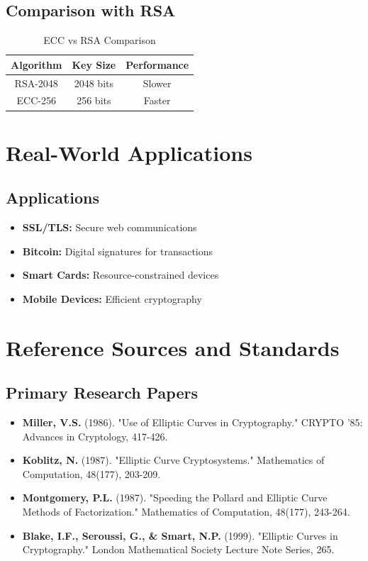 \documentclass[11pt,a4paper]{article}
\begin{document}
\subsection{Comparison with RSA}

\begin{table}[h]
\centering
\begin{tabular}{|c|c|c|}
\hline
\textbf{Algorithm} & \textbf{Key Size} & \textbf{Performance} \\
\hline
RSA-2048 & 2048 bits & Slower \\
ECC-256 & 256 bits & Faster \\
\hline
\end{tabular}
\caption{ECC vs RSA Comparison}
\end{table}

\section{Real-World Applications}

\subsection{Applications}

\begin{itemize}
    \item \textbf{SSL/TLS:} Secure web communications
    \item \textbf{Bitcoin:} Digital signatures for transactions
    \item \textbf{Smart Cards:} Resource-constrained devices
    \item \textbf{Mobile Devices:} Efficient cryptography
\end{itemize}

\section{Reference Sources and Standards}

\subsection{Primary Research Papers}

\begin{itemize}
    \item \textbf{Miller, V.S.} (1986). "Use of Elliptic Curves in Cryptography." CRYPTO '85: Advances in Cryptology, 417-426.
    \item \textbf{Koblitz, N.} (1987). "Elliptic Curve Cryptosystems." Mathematics of Computation, 48(177), 203-209.
    \item \textbf{Montgomery, P.L.} (1987). "Speeding the Pollard and Elliptic Curve Methods of Factorization." Mathematics of Computation, 48(177), 243-264.
    \item \textbf{Blake, I.F., Seroussi, G., \& Smart, N.P.} (1999). "Elliptic Curves in Cryptography." London Mathematical Society Lecture Note Series, 265.
\end{itemize}
\end{document}
